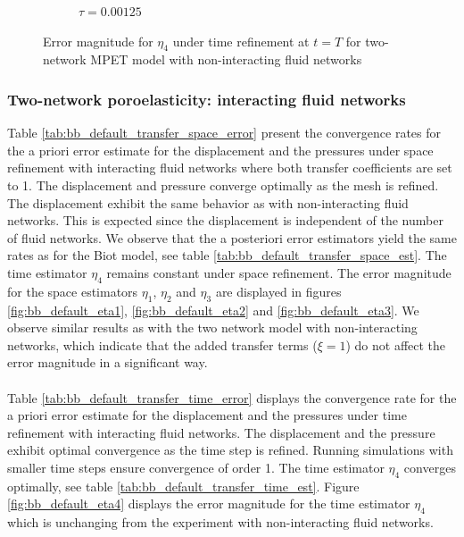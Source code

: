 \begin{figure}[h!]
\begin{subfigure}[b]{0.24\textwidth}
    \caption{$\tau=0.00125$}
  \end{subfigure}
  \caption{Error magnitude for $\eta_4$ under time refinement at $t=T$ for two-network MPET model with non-interacting fluid networks} \label{fig:bb_no_transfer_eta4}
\end{figure}
\clearpage
\subsubsection{Two-network poroelasticity: interacting fluid networks} \label{section:num_mpet2_default}
Table \ref{tab:bb_default_transfer_space_error} present the convergence rates for the a priori error estimate for the displacement and the pressures under space refinement with interacting fluid networks where both transfer coefficients are set to 1. The displacement and pressure converge optimally as the mesh is refined. The displacement exhibit the same behavior as with non-interacting fluid networks. This is expected since the displacement is independent of the number of fluid networks. We observe that the a posteriori error estimators yield the same rates as for the Biot model, see table \ref{tab:bb_default_transfer_space_est}. The time estimator $\eta_4$ remains constant under space refinement. The error magnitude for the space estimators $\eta_1$, $\eta_2$ and $\eta_3$ are displayed in figures \ref{fig:bb_default_eta1}, \ref{fig:bb_default_eta2} and \ref{fig:bb_default_eta3}. We observe similar results as with the two network model with non-interacting networks, which indicate that the added transfer terms ($\xi = 1$) do not affect the error magnitude in a significant way.
\\
\\
Table \ref{tab:bb_default_transfer_time_error} displays the convergence rate for the a priori error estimate for the displacement and the pressures under time refinement with interacting fluid networks.  The displacement and the pressure exhibit optimal convergence as the time step is refined. Running simulations with smaller time steps ensure convergence of order 1. The time estimator $\eta_4$ converges optimally, see table \ref{tab:bb_default_transfer_time_est}. Figure \ref{fig:bb_default_eta4} displays the error magnitude for the time estimator $\eta_4$ which is unchanging from the experiment with non-interacting fluid networks. 
